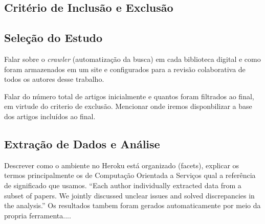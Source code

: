 \subsection{Crit\'{e}rio de Inclus\~{a}o e Exclus\~{a}o}

\subsection{Sele\c{c}\~{a}o do Estudo}
Falar sobre o \emph{crawler} (automatiza\c{c}\~ao da busca) em cada biblioteca digital e como foram armazenados em um site e configurados para a revis\~ao colaborativa de todos os autores desse trabalho. 

Falar do n\'{u}mero total de artigos inicialmente e quantos foram filtrados ao final, em virtude do criterio de exclus\~ao. Mencionar onde iremos disponbilizar a base dos artigos incluídos ao final.

\subsection{Extra\c{c}\~{a}o de Dados e An\'{a}lise}

Descrever como o ambiente no Heroku est\'{a} organizado (facets), explicar os termos principalmente os de Computa\c{c}\~ao Orientada a Servi\c{c}os qual a refer\^{e}ncia de significado que usamos. ``Each author individually extracted data from a subset of papers. We jointly discussed unclear issues and solved discrepancies in the analysis.'' Os resultados tambem foram gerados automaticamente por meio da propria ferramenta....

